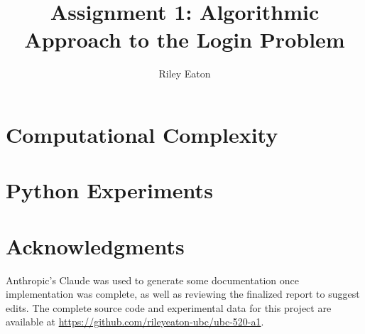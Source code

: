 \documentclass[acmsmall,screen]{acmart}
\title{Assignment 1: Algorithmic Approach to the Login Problem}
\author{Riley Eaton}
\affiliation{%
  \institution{University of British Columbia}
  \city{Kelowna}
  \state{BC}
  \country{Canada}
}
\begin{document}
\fancyfoot{} %

\maketitle

\section{Computational Complexity} \label{sec:complexity}


\section{Python Experiments} \label{sec:experiments}







\section*{Acknowledgments}
Anthropic's Claude was used to generate some documentation once implementation was complete, as well as reviewing the finalized report to suggest edits. The complete source code and experimental data for this project are available at \url{https://github.com/rileyeaton-ubc/ubc-520-a1}.
\end{document}
